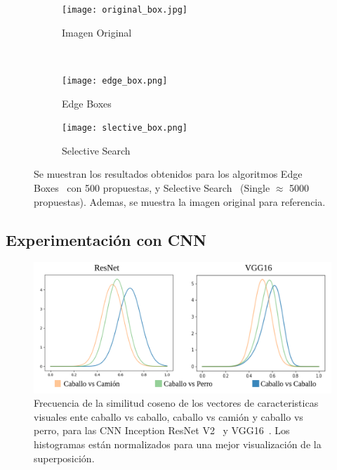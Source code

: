 \begin{figure}
	\begin{center}
		\begin{subfigure}{.5\textwidth}
			\centering
			\texttt{[image: original\_box.jpg]}
			\caption{Imagen Original}
			\label{fig:sfig1}
		\end{subfigure}\\
	\end{center}
	\begin{subfigure}{.5\textwidth}
		\centering
		\texttt{[image: edge\_box.png]}
		\caption{Edge Boxes~\cite{zitnick2014edge}}
		\label{fig:sfig2}
	\end{subfigure}
	\begin{subfigure}{.5\textwidth}
		\centering
		\texttt{[image: slective\_box.png]}
		\caption{Selective Search~\cite{uijlings2013selective}}
		\label{fig:sfig3}
	\end{subfigure}
	\begin{center}
	\end{center}
	\caption{Se muestran los resultados obtenidos para los algoritmos Edge Boxes~\cite{zitnick2014edge} con 500 propuestas, y Selective Search~\cite{uijlings2013selective} (Single $\approx$ 5000 propuestas). Ademas, se muestra la imagen original para referencia.}
	\label{fig:boxes_cuantitativos}
\end{figure}


\subsection{Experimentación con CNN} \label{ssec:experimentacionconcnn}
\begin{figure}
	\centering
	\includegraphics[width=1\linewidth]{img/vgg-vs-resnet}
	\caption{Frecuencia de la similitud coseno de los vectores de caracteristicas visuales ente caballo vs caballo, caballo vs camión y caballo vs perro, para las CNN Inception ResNet V2~\cite{resnet} y VGG16~\cite{simonyan2014very}. Los histogramas están normalizados para una mejor visualización de la superposición.}
	\label{fig:vgg-vs-resnet}
\end{figure}

